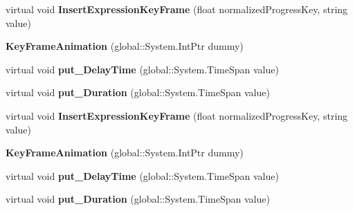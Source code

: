 \begin{DoxyCompactItemize}
virtual void {\bfseries Insert\+Expression\+Key\+Frame} (float normalized\+Progress\+Key, string value)
\item 
\mbox{\label{class_windows_1_1_u_i_1_1_composition_1_1_key_frame_animation_a41ceaa7dc6978478da5356996171bca7}} 
{\bfseries Key\+Frame\+Animation} (global\+::\+System.\+Int\+Ptr dummy)
\item 
\mbox{\label{class_windows_1_1_u_i_1_1_composition_1_1_key_frame_animation_ac62b6652265be62aec74788b234c8dc5}} 
virtual void {\bfseries put\+\_\+\+Delay\+Time} (global\+::\+System.\+Time\+Span value)
\item 
\mbox{\label{class_windows_1_1_u_i_1_1_composition_1_1_key_frame_animation_ac8c63cee562c78b3993f3c3b6ceae431}} 
virtual void {\bfseries put\+\_\+\+Duration} (global\+::\+System.\+Time\+Span value)
\item 
\mbox{\label{class_windows_1_1_u_i_1_1_composition_1_1_key_frame_animation_aa9ca1cc7ef8fee48aa80be58f822d74d}} 
virtual void {\bfseries Insert\+Expression\+Key\+Frame} (float normalized\+Progress\+Key, string value)
\item 
\mbox{\label{class_windows_1_1_u_i_1_1_composition_1_1_key_frame_animation_a41ceaa7dc6978478da5356996171bca7}} 
{\bfseries Key\+Frame\+Animation} (global\+::\+System.\+Int\+Ptr dummy)
\item 
\mbox{\label{class_windows_1_1_u_i_1_1_composition_1_1_key_frame_animation_ac62b6652265be62aec74788b234c8dc5}} 
virtual void {\bfseries put\+\_\+\+Delay\+Time} (global\+::\+System.\+Time\+Span value)
\item 
\mbox{\label{class_windows_1_1_u_i_1_1_composition_1_1_key_frame_animation_ac8c63cee562c78b3993f3c3b6ceae431}} 
virtual void {\bfseries put\+\_\+\+Duration} (global\+::\+System.\+Time\+Span value)
\item 

\end{DoxyCompactItemize}
